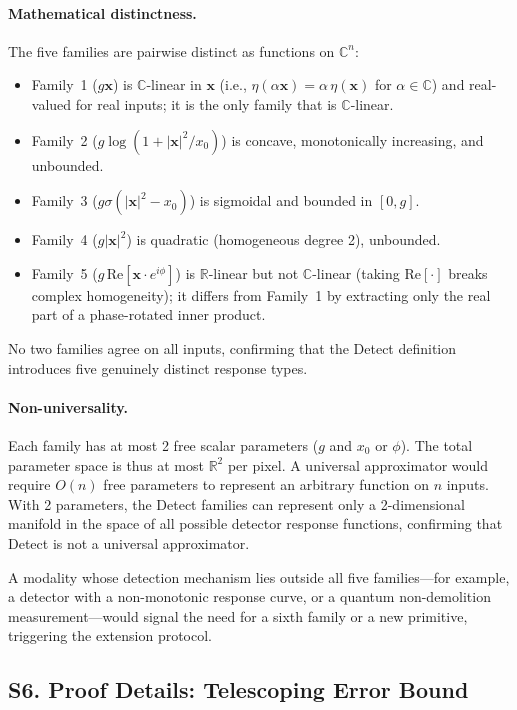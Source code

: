 \paragraph{Mathematical distinctness.}
The five families are pairwise distinct as functions on $\mathbb{C}^n$:
\begin{itemize}
  \item Family~1 ($g\mathbf{x}$) is $\mathbb{C}$-linear in $\mathbf{x}$ (i.e., $\eta(\alpha\mathbf{x}) = \alpha\,\eta(\mathbf{x})$ for $\alpha \in \mathbb{C}$) and real-valued for real inputs; it is the only family that is $\mathbb{C}$-linear.
  \item Family~2 ($g\log(1+|\mathbf{x}|^2/x_0)$) is concave, monotonically increasing, and unbounded.
  \item Family~3 ($g\sigma(|\mathbf{x}|^2 - x_0)$) is sigmoidal and bounded in $[0, g]$.
  \item Family~4 ($g|\mathbf{x}|^2$) is quadratic (homogeneous degree 2), unbounded.
  \item Family~5 ($g\,\mathrm{Re}[\mathbf{x} \cdot e^{i\phi}]$) is $\mathbb{R}$-linear but not $\mathbb{C}$-linear (taking $\mathrm{Re}[\cdot]$ breaks complex homogeneity); it differs from Family~1 by extracting only the real part of a phase-rotated inner product.
\end{itemize}
No two families agree on all inputs, confirming that the Detect definition introduces five genuinely distinct response types.

\paragraph{Non-universality.}
Each family has at most 2 free scalar parameters ($g$ and $x_0$ or $\phi$). The total parameter space is thus at most $\mathbb{R}^2$ per pixel. A universal approximator would require $O(n)$ free parameters to represent an arbitrary function on $n$ inputs. With 2 parameters, the Detect families can represent only a 2-dimensional manifold in the space of all possible detector response functions, confirming that Detect is not a universal approximator.

A modality whose detection mechanism lies outside all five families---for example, a detector with a non-monotonic response curve, or a quantum non-demolition measurement---would signal the need for a sixth family or a new primitive, triggering the extension protocol.


\subsection*{S6. Proof Details: Telescoping Error Bound}
\label{sec:supp_submult}


